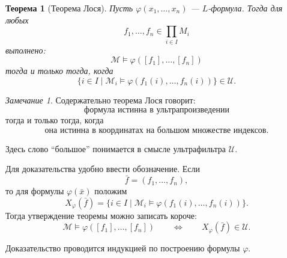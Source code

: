 \documentclass[12pt,a4paper,oneside,openany]{book}
\theoremstyle{definition}
\theoremstyle{plain}
\newtheorem{theorem}{Теорема}[chapter]
\theoremstyle{remark}
\newtheorem{remark}{Замечание}[chapter]
\begin{document}
\begin{theorem}[Теорема Лося]
Пусть $\varphi(x_1,\ldots,x_n)$ — $L$-формула. Тогда для любых
\[
f_1,\ldots,f_n\in\prod_{i\in I}M_i
\]
выполнено:
\[
\mathcal M\models\varphi([f_1],\ldots,[f_n])
\]
тогда и только тогда, когда
\[
\{i\in I\mid
\mathcal M_i\models
\varphi(f_1(i),\ldots,f_n(i))
\}\in\mathcal U.
\]
\end{theorem}

\begin{remark}
Содержательно теорема Лося говорит:
\[
\text{формула истинна в ультрапроизведении}
\]
тогда и только тогда, когда
\[
\text{она истинна в координатах на большом множестве индексов}.
\]

Здесь слово ``большое'' понимается в смысле ультрафильтра $\mathcal U$.
\end{remark}

Для доказательства удобно ввести обозначение. Если
\[
\bar f=(f_1,\ldots,f_n),
\]
то для формулы $\varphi(\bar x)$ положим
\[
X_\varphi(\bar f)
=
\{i\in I\mid
\mathcal M_i\models\varphi(f_1(i),\ldots,f_n(i))
\}.
\]
Тогда утверждение теоремы можно записать короче:
\[
\mathcal M\models\varphi([f_1],\ldots,[f_n])
\qquad
\Longleftrightarrow
\qquad
X_\varphi(\bar f)\in\mathcal U.
\]

Доказательство проводится индукцией по построению формулы $\varphi$.
\end{document}
